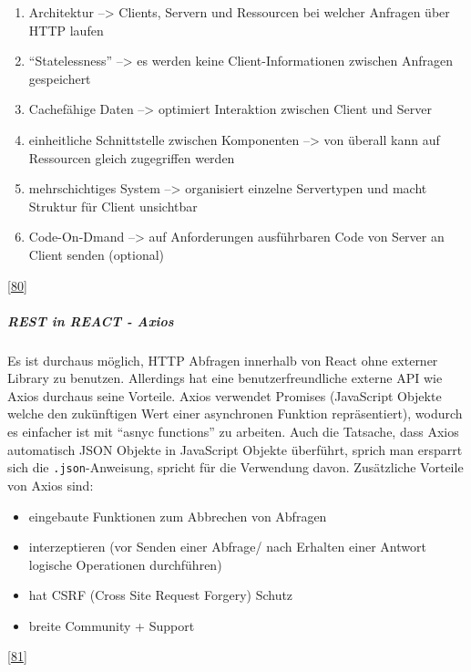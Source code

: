 \documentclass[
    headings=optiontotocandhead,%
    twoside,
    numbers=noenddot,%
    12pt, %
    titlepage, %
    parskip=full, %
    listof=leveldown, 
    numbers=noenddot, %
    a4paper,DIV=14,
    BCOR=15mm,
]{scrbook}
\newcommand{\passthrough}[1]{#1}
\providecommand{\tightlist}{%
  \setlength{\itemsep}{0pt}\setlength{\parskip}{0pt}}
\begin{document}
\begin{enumerate}
\def\labelenumi{\arabic{enumi}.}
\tightlist
\item
  Architektur --\textgreater{} Clients, Servern und Ressourcen bei
  welcher Anfragen über HTTP laufen
\item
  ``Statelessness'' --\textgreater{} es werden keine
  Client-Informationen zwischen Anfragen gespeichert
\item
  Cachefähige Daten --\textgreater{} optimiert Interaktion zwischen
  Client und Server
\item
  einheitliche Schnittstelle zwischen Komponenten --\textgreater{} von
  überall kann auf Ressourcen gleich zugegriffen werden
\item
  mehrschichtiges System --\textgreater{} organisiert einzelne
  Servertypen und macht Struktur für Client unsichtbar
\item
  Code-On-Dmand --\textgreater{} auf Anforderungen ausführbaren Code von
  Server an Client senden (optional)
\end{enumerate}

{[}\protect\hyperlink{ref-RedHat-REST}{80}{]}

\hypertarget{rest-in-react---axios}{%
\subparagraph{REST in REACT - Axios}\label{rest-in-react---axios}}

Es ist durchaus möglich, HTTP Abfragen innerhalb von React ohne externer
Library zu benutzen. Allerdings hat eine benutzerfreundliche externe API
wie Axios durchaus seine Vorteile. Axios verwendet Promises (JavaScript
Objekte welche den zukünftigen Wert einer asynchronen Funktion
repräsentiert), wodurch es einfacher ist mit ``asnyc functions'' zu
arbeiten. Auch die Tatsache, dass Axios automatisch JSON Objekte in
JavaScript Objekte überführt, sprich man ersparrt sich die
\passthrough{\lstinline!.json!}-Anweisung, spricht für die Verwendung
davon. Zusätzliche Vorteile von Axios sind:

\begin{itemize}
\tightlist
\item
  eingebaute Funktionen zum Abbrechen von Abfragen
\item
  interzeptieren (vor Senden einer Abfrage/ nach Erhalten einer Antwort
  logische Operationen durchführen)
\item
  hat CSRF (Cross Site Request Forgery) Schutz
\item
  breite Community + Support
\end{itemize}

{[}\protect\hyperlink{ref-GeeksForGeeks-Axios}{81}{]}
\end{document}

